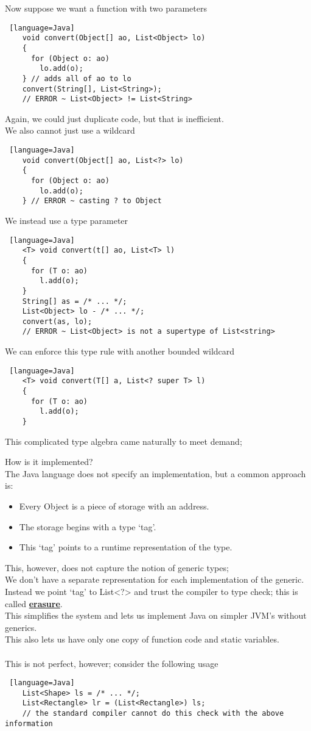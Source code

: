 \documentclass[../../lecture_notes.tex]{subfiles}
\begin{document}
\noindent Now suppose we want a function with two parameters
\begin{lstlisting} [language=Java]
	void convert(Object[] ao, List<Object> lo)
	{
	  for (Object o: ao)
	    lo.add(o);
	} // adds all of ao to lo
	convert(String[], List<String>); 
	// ERROR ~ List<Object> != List<String>
\end{lstlisting} \medskip

\noindent Again, we could just duplicate code, but that is inefficient.\\
We also cannot just use a wildcard
\begin{lstlisting} [language=Java]
	void convert(Object[] ao, List<?> lo)
	{
	  for (Object o: ao)
	    lo.add(o);
	} // ERROR ~ casting ? to Object
\end{lstlisting} \medskip

\noindent We instead use a type parameter
\begin{lstlisting} [language=Java]
	<T> void convert(t[] ao, List<T> l)
	{
	  for (T o: ao)
	    l.add(o);
	}
	String[] as = /* ... */;
	List<Object> lo - /* ... */;
	convert(as, lo);
	// ERROR ~ List<Object> is not a supertype of List<string>
\end{lstlisting} \medskip

\noindent We can enforce this type rule with another bounded wildcard
\begin{lstlisting} [language=Java]
	<T> void convert(T[] a, List<? super T> l)
	{
	  for (T o: ao)
	    l.add(o);
	}
\end{lstlisting} \medskip
\noindent This complicated type algebra came naturally to meet demand;

How is it implemented?\\
The Java language does not specify an implementation, but a common approach is:
\begin{itemize} [itemsep=0mm]
	\item Every Object is a piece of storage with an address.
	\item The storage begins with a type ‘tag’.
	\item This ‘tag’ points to a runtime representation of the type.
\end{itemize}
This, however, does not capture the notion of generic types;\\
	\indent We don’t have a separate representation for each implementation of the generic.\\
	\indent Instead we point ‘tag’ to List<?> and trust the compiler to type check; 
		this is called \textbf{\underline{erasure}}.\\
This simplifies the system and lets us implement Java on simpler JVM’s without generics.\\
This also lets us have only one copy of function code and static variables.\\
\\
This is not perfect, however; consider the following usage
\begin{lstlisting} [language=Java]
	List<Shape> ls = /* ... */;
	List<Rectangle> lr = (List<Rectangle>) ls;
	// the standard compiler cannot do this check with the above information
\end{lstlisting} \medskip
\end{document}
